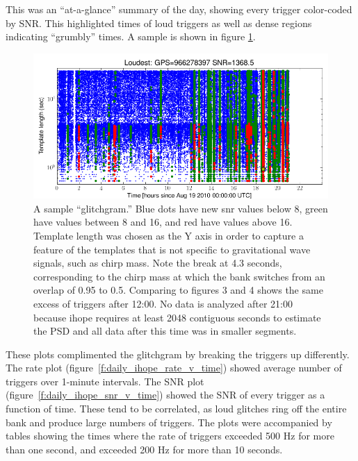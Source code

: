 
This was an ``at-a-glance'' summary of the day, showing every trigger
color-coded by SNR.  This highlighted times of loud triggers as well
as dense regions indicating ``grumbly'' times.  A sample is shown in
figure \ref{f:daily_ihope_glitchgram}.

\begin{figure}
  \includegraphics[width=\linewidth]{figures/detchar/H1_1_UNCLUSTERED_glitchgram.png}
  \caption[The Aug 19th daily ihope ``glitchgram'']{
  \label{f:daily_ihope_glitchgram}
A sample ``glitchgram.'' Blue dots have
new snr values below 8, green have values between 8 and 16,
and red have values above 16.  Template length was chosen as the Y
axis in order to capture a feature of the templates that is not
specific to gravitational wave signals, such as chirp mass.
Note the break at 4.3 seconds, corresponding to the
chirp mass at which the bank switches from an overlap of 0.95 to 0.5.
Comparing to figures 3 and 4 shows the same 
excess of triggers after 12:00.  No data is analyzed after 21:00
because ihope requires at least 2048 contiguous seconds to estimate
the PSD and all data after this time was in smaller segments.}
\end{figure}%



These plots complimented the glitchgram by breaking the triggers up
differently.  The rate plot (figure~\ref{f:daily_ihope_rate_v_time})
showed average number of triggers over 1-minute intervals.  The SNR
plot (figure~\ref{f:daily_ihope_snr_v_time}) showed the SNR of every
trigger as a function of time.  These tend to be correlated, as loud
glitches ring off the entire bank and produce large numbers of
triggers.  The plots were accompanied by tables showing the times
where the rate of triggers exceeded 500 Hz for more than one second,
and exceeded 200 Hz for more than 10 seconds.

